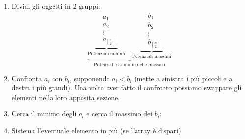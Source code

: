 \documentclass[a4paper]{article}
\begin{document}
\begin{enumerate}
  \item Dividi gli oggetti in 2 gruppi:
    \[
      \underbrace{
        \underbrace{
          \begin{aligned}
          &a_1\\
          &a_2\\
          &\vdots\\
          &a_{\left\lfloor \frac{n}{2} \right\rfloor}
          \end{aligned}
        }_{\text{Potenziali minimi}}
        \quad
        \underbrace{
          \begin{aligned}
        &b_1\\
        &b_2\\
        &\vdots\\
        &b_{\left\lceil \frac{n}{2} \right\rceil}
          \end{aligned}
        }_{\text{Potenziali massimi}}
      }_{\text{Potenziali sia minimi che massimi}}
    \] 

  \item Confronta \( a_i \) con \( b_i \), supponendo \( a_i < b_i \) (mette a sinistra
    i più piccoli e a destra i più grandi). Una volta aver fatto il confronto possiamo swappare
     gli elementi nella loro apposita sezione.

  \item Cerca il minimo degli \( a_i \) e cerca il massimo dei \( b_i \):

  \item Sistema l'eventuale elemento in più (se l'array è dispari) 
\end{enumerate}
\end{document}
